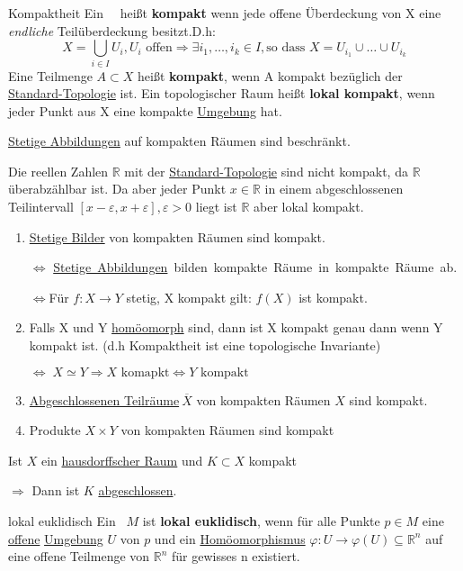 \begin{titleDef}{Kompaktheit}
\label{kompakt}
Ein \Toporeflong ~\Topo~heißt \textbf{kompakt} wenn jede offene Überdeckung von X eine \textit{endliche} Teilüberdeckung besitzt.D.h:
$$X=\bigcup_{i\in I}U_i, U_i \text{ offen} \Longrightarrow \exists i_1,\ldots,i_k\in I, \text{so dass } X=U_{i_1}\cup\ldots\cup U_{i_k}$$
Eine Teilmenge $A\subset X$ heißt \textbf{kompakt}, wenn A kompakt bezüglich der \hyperref[teilraumTopo]{Standard-Topologie} ist.
\label{lokalkompakt}
Ein topologischer Raum heißt \textbf{lokal kompakt}, wenn jeder Punkt aus X eine kompakte \hyperref[Umgebung]{Umgebung} hat.\par
\hyperref[stetig]{Stetige Abbildungen} auf kompakten Räumen sind beschränkt.\par
Die reellen Zahlen $\mathbb{R}$ mit der \hyperref[stdTopo]{Standard-Topologie} sind nicht kompakt, da $\mathbb{R}$ überabzählbar ist. Da aber jeder Punkt $x\in\mathbb{R}$ in einem abgeschlossenen Teilintervall $[x-\varepsilon,x+\varepsilon],\varepsilon>0$ liegt ist $\mathbb{R}$ aber lokal kompakt.\par
\listbsp
\begin{enumerate}
	\item \hyperref[stetig]{Stetige Bilder} von kompakten Räumen sind kompakt.\par$\Longleftrightarrow$ \mbox{\hyperref[stetig]{Stetige Abbildungen} bilden kompakte Räume in kompakte Räume ab.}\par$\Longleftrightarrow$Für $f:X\to Y$ stetig, X kompakt gilt: $f(X)$ ist kompakt.
	\item Falls X und Y \hyperref[homoemorph]{homöomorph} sind, dann ist X kompakt genau dann wenn Y kompakt ist. (d.h Kompaktheit ist eine topologische Invariante)\par$\Longleftrightarrow\;X\simeq Y \Rightarrow X \text{ komapkt}\Leftrightarrow Y \text{ kompakt}$
	\item \hyperref[abgeschlossen]{Abgeschlossenen Teilräume}$\ \overline{X}$ von kompakten Räumen $X$ sind kompakt.
	\item Produkte $X\times Y$ von kompakten Räumen sind kompakt 
\end{enumerate}
Ist $X$ ein \hyperref[hausdorffsch]{hausdorffscher Raum} und $K\subset X$ kompakt\par $\Rightarrow$ Dann ist $K$ \hyperref[abgeschlossen]{abgeschlossen}.
\end{titleDef}

\begin{titleDef}{lokal euklidisch}
	\label{lokaleukldisch}
	Ein \Toporeflong~$M$ ist \textbf{lokal euklidisch}, wenn für alle Punkte $p\in M$ eine \hyperref[offen]{offene} \hyperref[Umgebung]{Umgebung} $U$ von $p$ und ein \hyperref[homoemorph]{Homöomorphismus} ${\varphi:U\to \varphi(U)\subseteq\mathbb{R}^n}$ auf eine offene Teilmenge von $\mathbb{R}^n$ für gewisses n existiert.
\end{titleDef}

